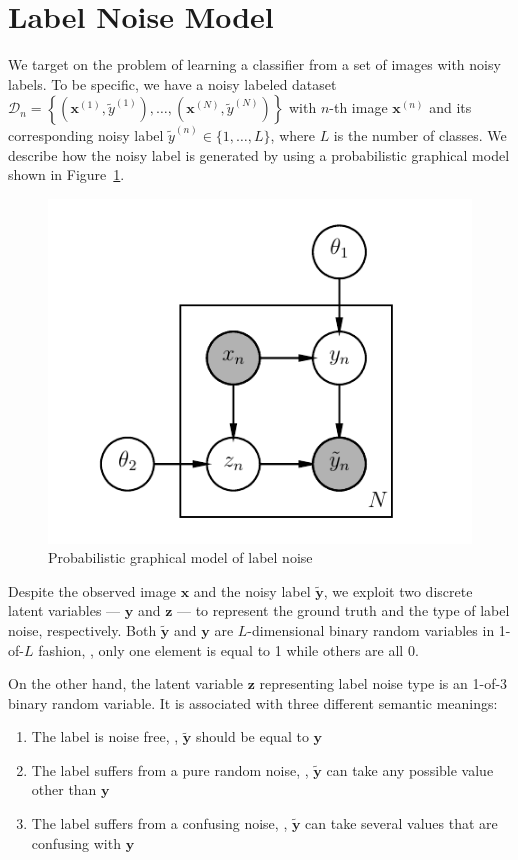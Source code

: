 \documentclass[10pt,twocolumn,letterpaper]{article}
\def\vec{\mathbf}
\begin{document}
\section{Label Noise Model} %
\label{sec:label_noise_model}
We target on the problem of learning a classifier from a set of images with noisy labels. To be specific, we have a noisy labeled dataset $\mathcal{D}_n=\left\{\left(\vec{x}^{(1)}, \tilde{y}^{(1)}\right), \dots, \left(\vec{x}^{(N)}, \tilde{y}^{(N)}\right)\right\}$ with $n$-th image $\vec{x}^{(n)}$ and its corresponding noisy label $\tilde{y}^{(n)} \in \{1,\dots,L\}$, where $L$ is the number of classes. We describe how the noisy label is generated by using a probabilistic graphical model shown in Figure~\ref{fig:noise_pgm}.

\begin{figure}[h!]
\begin{center}
\includegraphics[width=0.5\linewidth]{figure/pgm.pdf}
\end{center}
\caption{Probabilistic graphical model of label noise}
\label{fig:noise_pgm}
\end{figure}

Despite the observed image $\vec{x}$ and the noisy label $\tilde{\vec{y}}$, we exploit two discrete latent variables --- $\vec{y}$ and $\vec{z}$ --- to represent the ground truth and the type of label noise, respectively. Both $\tilde{\vec{y}}$ and $\vec{y}$ are $L$-dimensional binary random variables in 1-of-$L$ fashion, \ie, only one element is equal to 1 while others are all 0.

On the other hand, the latent variable $\vec{z}$ representing label noise type is an 1-of-3 binary random variable. It is associated with three different semantic meanings:
\begin{enumerate}
    \item The label is noise free, \ie, $\tilde{\vec{y}}$ should be equal to $\vec{y}$
    \item The label suffers from a pure random noise, \ie, $\tilde{\vec{y}}$ can take any possible value other than $\vec{y}$
    \item The label suffers from a confusing noise, \ie, $\tilde{\vec{y}}$ can take several values that are confusing with $\vec{y}$
\end{enumerate}
\end{document}
